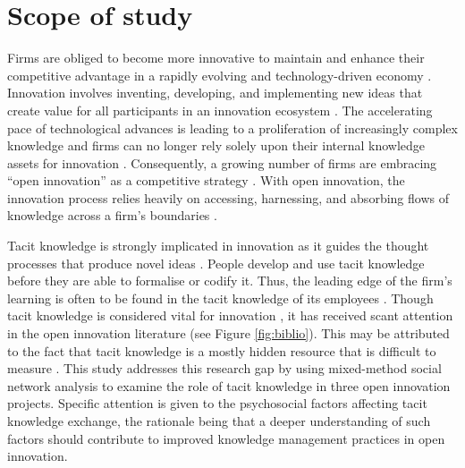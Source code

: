 
\section{Scope of study}

Firms are obliged to become more innovative to maintain and enhance their competitive advantage in a rapidly evolving and technology\hyp{}driven economy \citep{lubit2001keys,urbancova2013competitive}. Innovation involves inventing, developing, and implementing new ideas that create value for all participants in an innovation ecosystem \citep{garud2013perspectives}. The accelerating pace of technological advances is leading to a proliferation of increasingly complex knowledge and firms can no longer rely solely upon their internal knowledge assets for innovation \citep{chesbrough2009open,enkel2009open}. Consequently, a growing number of firms are embracing \enquote{open innovation} as a competitive strategy \citep{chesbrough2003open,enkel2009open,stanko2017under}. With open innovation, the innovation process relies heavily on accessing, harnessing, and absorbing flows of knowledge across a firm’s boundaries \citep{chesbrough2017future}. \medskip

Tacit knowledge is strongly implicated in innovation as it guides the thought processes that produce novel ideas \citep{leonard1998role,cavusgil2003tacit}. People develop and use tacit knowledge before they are able to formalise or codify it. Thus, the leading edge of the firm’s learning is often to be found in the tacit knowledge of its employees \citep{horvath2000working}. Though tacit knowledge is considered vital for innovation \citep{leonard1998role,von2000enabling,cavusgil2003tacit,amar2008descriptive,seidler2008use}, it has received scant attention in the open innovation literature (see Figure \ref{fig:biblio}). This may be attributed to the fact that tacit knowledge is a mostly hidden resource that is difficult to measure \citep{haldin2000difficulties,jasimuddin2005paradox}. This study addresses this research gap by using mixed\hyp{}method social network analysis to examine the role of tacit knowledge in three open innovation projects. Specific attention is given to the psychosocial factors affecting tacit knowledge exchange, the rationale being that a deeper understanding of such factors should contribute to improved knowledge management practices in open innovation. \medskip

